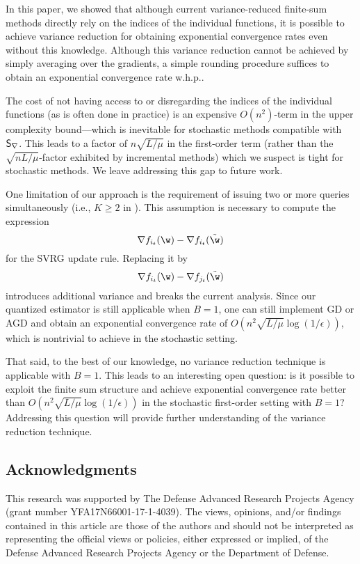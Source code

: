 \documentclass{article}
\theoremstyle{definition}  \newtheorem{exercise}{Exercise}
\theoremstyle{plain}
\newcommand{\pref}[1]{\prettyref{#1}}
\newcommand{\strcvx}{\mu} \newcommand{\query}{B}
\theoremstyle{definition}
\theoremstyle{remark}
\begin{document}
In this paper, we showed that although current variance-reduced finite-sum 
methods directly rely on the indices of the individual functions, it is 
possible to achieve variance reduction for obtaining 
exponential convergence rates even without this knowledge. 
Although this variance reduction cannot be achieved 
by simply averaging over the gradients, a simple rounding procedure 
suffices to obtain an exponential convergence rate w.h.p.. 

The cost of not having access to or disregarding the indices of the 
individual functions (as is often done in practice) is an expensive 
$O(n^2)$-term in the upper complexity bound---which is inevitable for 
stochastic methods compatible with~$\mathsf{S}_{\nabla}$. This leads to a factor of 
$n\sqrt{L/\strcvx}$ 
in the first-order term (rather than the $\sqrt{nL/\strcvx}$-factor 
exhibited 
by incremental methods) which we suspect is tight for stochastic methods. 
We 
leave addressing this gap to future work. 


One limitation of our approach is the requirement of issuing two or more 
queries simultaneously (i.e., $K\ge2$ in \pref{eq:stoch_orc}). This 
assumption 
is necessary to compute the expression 
\[ \nabla f_{i_t}(\w) - \nabla f_{i_t}(\tilde{\w})\]
for the SVRG update rule. Replacing it by 
\[ \nabla f_{i_t}(\w) - \nabla f_{j_t}(\tilde{\w})\]
introduces additional variance and breaks the current analysis.
Since our quantized estimator is still applicable when $\query=1$, one 
can still implement GD or AGD and obtain an exponential convergence rate 
of $O(n^2 \sqrt{L/\mu} \log (1/\epsilon))$, which is nontrivial 
to achieve in the stochastic setting. 

That said, to the best of our knowledge, no variance reduction 
technique is applicable with $\query=1$. This leads to an interesting 
open question: is it possible to exploit the finite sum structure and achieve 
exponential convergence rate better than $O(n^2 \sqrt{L/\mu} \log 
(1/\epsilon))$ in the stochastic first-order setting with $\query=1$? 
Addressing 
this question will provide further understanding of the variance 
reduction 
technique.

\subsection*{Acknowledgments}
This research was supported by The Defense Advanced Research Projects Agency 
(grant number YFA17N66001-17-1-4039). The views, opinions, and/or findings 
contained in this article are those of the authors and should not be 
interpreted as representing the official views or policies, either expressed or 
implied, of the Defense Advanced Research Projects Agency or the Department of 
Defense.
\end{document}
